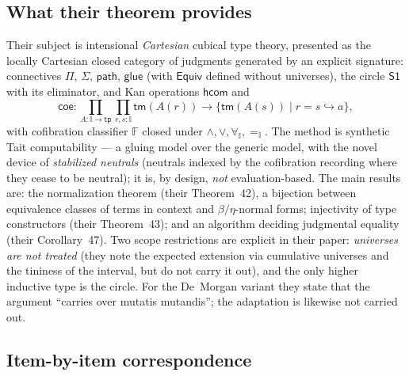 \documentclass{lmcs}
\newcommand{\I}{\mathbb{I}}
\begin{document}
\subsection{What their theorem provides}

Their subject is intensional \emph{Cartesian} cubical type theory,
presented as the locally Cartesian closed category of judgments
generated by an explicit signature: connectives $\Pi$, $\Sigma$,
$\mathsf{path}$, $\mathsf{glue}$ (with $\mathsf{Equiv}$ defined
without universes), the circle $\mathsf{S1}$ with its eliminator, and
Kan operations $\mathsf{hcom}$ and
\[
  \mathsf{coe} : \textstyle\prod_{A : \I \to \mathsf{tp}}
  \prod_{r, s : \I} \mathsf{tm}(A(r)) \to
  \{\mathsf{tm}(A(s)) \mid r = s \hookrightarrow a\},
\]
with cofibration classifier $\mathbb{F}$ closed under
$\wedge, \vee, \forall_\I, =_\I$.  The method is synthetic Tait
computability --- a gluing model over the generic model, with the
novel device of \emph{stabilized neutrals} (neutrals indexed by the
cofibration recording where they cease to be neutral); it is, by
design, \emph{not} evaluation-based.  The main results are: the
normalization theorem (their Theorem~42), a bijection between
equivalence classes of terms in context and $\beta/\eta$-normal
forms; injectivity of type constructors (their Theorem~43); and an
algorithm deciding judgmental equality (their Corollary~47).  Two
scope restrictions are explicit in their paper: \emph{universes are
not treated} (they note the expected extension via cumulative
universes and the tininess of the interval, but do not carry it
out), and the only higher inductive type is the circle.  For the
De~Morgan variant they state that the argument ``carries over
mutatis mutandis''; the adaptation is likewise not carried out.

\subsection{Item-by-item correspondence}
\end{document}
